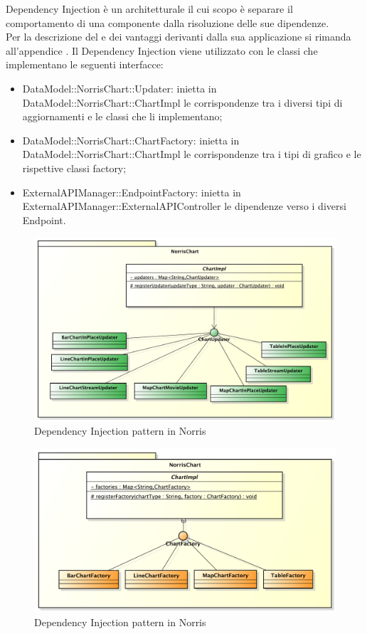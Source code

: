 			Dependency Injection è un  architetturale il cui scopo è separare il comportamento di una componente dalla risoluzione delle sue dipendenze.\\
			Per la descrizione del  e dei vantaggi derivanti dalla sua applicazione si rimanda all'appendice .
				Il  Dependency Injection viene utilizzato con le classi che implementano le seguenti interfacce:
				\begin{itemize}
					\item DataModel::NorrisChart::Updater: inietta in DataModel::NorrisChart::ChartImpl le corrispondenze tra i diversi tipi di aggiornamenti e le classi che li implementano;
					\item DataModel::NorrisChart::ChartFactory: inietta in DataModel::NorrisChart::ChartImpl le corrispondenze tra i tipi di grafico e le rispettive classi factory;
					\item ExternalAPIManager::EndpointFactory: inietta in ExternalAPIManager::ExternalAPIController le dipendenze verso i diversi Endpoint.
				\end{itemize}
				\begin{figure}[H]\centering
	        		\includegraphics[width=\textwidth]{SpecificaTecnica/Pics/DesignPatternNorris/DependencyInjection1}
	        		\caption{Dependency Injection pattern in Norris}
	    		\end{figure}
	    		\begin{figure}[H]\centering
	        		\includegraphics[width=\textwidth]{SpecificaTecnica/Pics/DesignPatternNorris/DependencyInjection2}
	        		\caption{Dependency Injection pattern in Norris}
	    		\end{figure}
